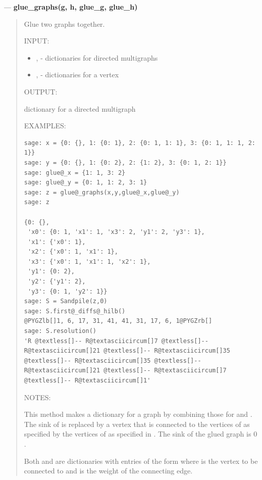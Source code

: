 \documentclass[letterpaper,10pt,english]{manual}
\begin{document}
---
\hypertarget{glue-graphs-g-h-glue-g-glue-h}{}
\textbf{glue\_graphs(g, h, glue\_g, glue\_h)}
\begin{quote}

Glue two graphs together.

INPUT:
\begin{itemize}
\item {} 
,  - dictionaries for directed multigraphs

\item {} 
,  - dictionaries for a vertex

\end{itemize}

OUTPUT:

dictionary for a directed multigraph

EXAMPLES:

\begin{Verbatim}[commandchars=@\[\]]
sage: x = {0: {}, 1: {0: 1}, 2: {0: 1, 1: 1}, 3: {0: 1, 1: 1, 2: 1}}
sage: y = {0: {}, 1: {0: 2}, 2: {1: 2}, 3: {0: 1, 2: 1}}
sage: glue@_x = {1: 1, 3: 2}
sage: glue@_y = {0: 1, 1: 2, 3: 1}
sage: z = glue@_graphs(x,y,glue@_x,glue@_y)
sage: z

{0: {},
 'x0': {0: 1, 'x1': 1, 'x3': 2, 'y1': 2, 'y3': 1},
 'x1': {'x0': 1},
 'x2': {'x0': 1, 'x1': 1},
 'x3': {'x0': 1, 'x1': 1, 'x2': 1},
 'y1': {0: 2},
 'y2': {'y1': 2},
 'y3': {0: 1, 'y2': 1}}
sage: S = Sandpile(z,0)
sage: S.first@_diffs@_hilb()
@PYGZlb[]1, 6, 17, 31, 41, 41, 31, 17, 6, 1@PYGZrb[]
sage: S.resolution()
'R @textless[]-- R@textasciicircum[]7 @textless[]-- R@textasciicircum[]21 @textless[]-- R@textasciicircum[]35 @textless[]-- R@textasciicircum[]35 @textless[]-- R@textasciicircum[]21 @textless[]-- R@textasciicircum[]7 @textless[]-- R@textasciicircum[]1'
\end{Verbatim}

NOTES:

This method makes a dictionary for a graph by combining those for  and
.  The sink of  is replaced by a vertex that is connected to the
vertices of  as specified by  the vertices of  as
specified in .  The sink of the glued graph is $0$.

Both  and  are dictionaries with entries of the form
 where  is the vertex to be connected to and  is the weight
of the connecting edge.
\end{quote}
\end{document}
